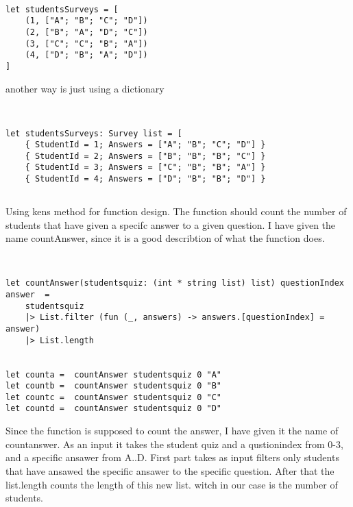 \documentclass{article}
\begin{document}
    \begin{lstlisting}

let studentsSurveys = [
    (1, ["A"; "B"; "C"; "D"])
    (2, ["B"; "A"; "D"; "C"])
    (3, ["C"; "C"; "B"; "A"])
    (4, ["D"; "B"; "A"; "D"])
]

    \end{lstlisting}


another way is just using a dictionary


    \begin{lstlisting}


let studentsSurveys: Survey list = [
    { StudentId = 1; Answers = ["A"; "B"; "C"; "D"] }
    { StudentId = 2; Answers = ["B"; "B"; "B"; "C"] }
    { StudentId = 3; Answers = ["C"; "B"; "B"; "A"] }
    { StudentId = 4; Answers = ["D"; "B"; "B"; "D"] }

    \end{lstlisting}





\subsection{}

Using kens method for function design. The function should count the number of students that have given a specifc answer to a given question. I have given the name countAnswer, since it is a good describtion of what the function does.


 \begin{lstlisting}


let countAnswer(studentsquiz: (int * string list) list) questionIndex answer  = 
    studentsquiz
    |> List.filter (fun (_, answers) -> answers.[questionIndex] = answer)
    |> List.length 


let counta =  countAnswer studentsquiz 0 "A"
let countb =  countAnswer studentsquiz 0 "B"
let countc =  countAnswer studentsquiz 0 "C"
let countd =  countAnswer studentsquiz 0 "D"

    \end{lstlisting}

Since the function is supposed to count the answer, I have given it the name of countanswer. As an input it takes the student quiz and a qustionindex from 0-3, and a specific ansawer from A..D. First part takes as input  filters only students that have ansawed the specific ansawer to the specific question. After that the list.length counts the length of this new list. witch in our case is the number of students.
\end{document}
